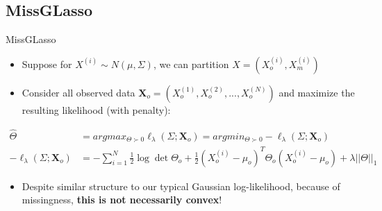 \documentclass{beamer}
\begin{document}
\subsection{MissGLasso}

\begin{frame}{MissGLasso}
    \begin{itemize}
        \item Suppose for $X^{(i)} \sim N(\mu, \Sigma)$, we can partition $X = (X^{(i)}_o, X^{(i)}_m)$
        \item Consider all observed data $\mathbf{X}_o = (X_o^{(1)}, X_o^{(2)}, ..., X_o^{(N)})$ and maximize the resulting likelihood (with penalty):
    \end{itemize}
    
    \begin{align*}
        \hat\Theta 
        &= 
        argmax_{\Theta\succ 0}
        \ell_\lambda(\Sigma; \mathbf{X}_o)
        =
        argmin_{\Theta\succ 0}
        -\ell_\lambda(\Sigma; \mathbf{X}_o)
        \\
        -
        \ell_\lambda(\Sigma; \mathbf{X}_o)
        &=
        -
        \sum_{i=1}^N 
        \frac{1}{2} \log \det \Theta_o
        +
        \frac{1}{2} (X_o^{(i)}-\mu_o)^T \Theta_o (X_o^{(i)} -\mu_o)
        +
        \lambda ||\Theta||_1
    \end{align*}

    \begin{itemize}
        \item Despite similar structure to our typical Gaussian log-likelihood, because of missingness, {\bf this is not necessarily convex}! 
    \end{itemize}
\end{frame}
\end{document}
